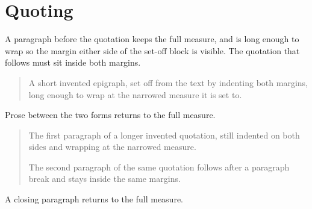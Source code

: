 \documentclass{article}
\begin{document}
\section*{Quoting}

A paragraph before the quotation keeps the full measure, and is long
enough to wrap so the margin either side of the set-off block is visible.
The quotation that follows must sit inside both margins.

\begin{quote}
A short invented epigraph, set off from the text by indenting both
margins, long enough to wrap at the narrowed measure it is set to.
\end{quote}

Prose between the two forms returns to the full measure.

\begin{quotation}
The first paragraph of a longer invented quotation, still indented on
both sides and wrapping at the narrowed measure.

The second paragraph of the same quotation follows after a paragraph
break and stays inside the same margins.
\end{quotation}

A closing paragraph returns to the full measure.
\end{document}
